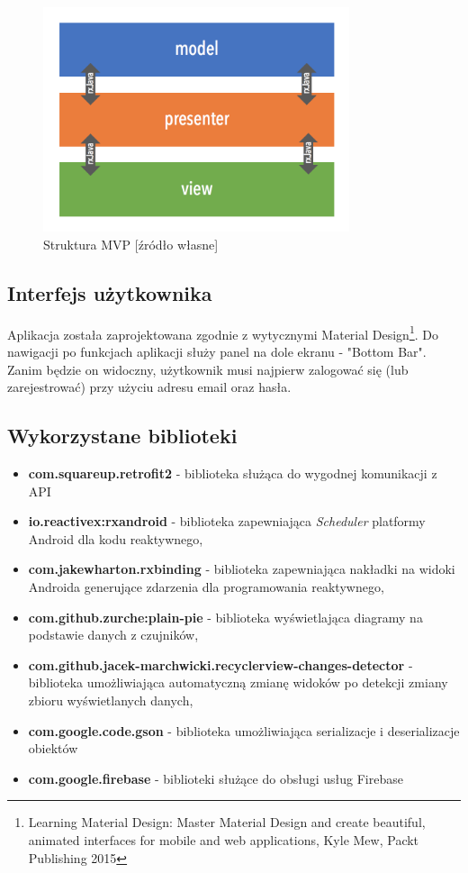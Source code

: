 \begin{figure}[H]
    \centering
    \includegraphics[width=9cm]{android-mvp.png}
    \caption{Struktura MVP [źródło własne]}
\end{figure}

\subsection{Interfejs użytkownika}
Aplikacja została zaprojektowana zgodnie z wytycznymi Material Design\footnote{Learning Material Design: Master Material Design and create beautiful, animated interfaces for mobile and web applications, Kyle Mew, Packt Publishing 2015}.
Do nawigacji po funkcjach aplikacji służy panel na dole ekranu - "Bottom Bar".
Zanim będzie on widoczny, użytkownik musi najpierw zalogować się (lub zarejestrować) przy użyciu adresu email oraz hasła.

\subsection{Wykorzystane biblioteki}
\begin{itemize}
    \item \textbf{com.squareup.retrofit2} - biblioteka służąca do wygodnej komunikacji z API
    \item \textbf{io.reactivex:rxandroid} - biblioteka zapewniająca \textit{Scheduler} platformy Android dla kodu reaktywnego,
    \item \textbf{com.jakewharton.rxbinding} - biblioteka zapewniająca nakładki na widoki Androida generujące zdarzenia dla programowania reaktywnego,
    \item \textbf{com.github.zurche:plain-pie} - biblioteka wyświetlająca diagramy na podstawie danych z czujników,
    \item \textbf{com.github.jacek-marchwicki.recyclerview-changes-detector} - biblioteka umożliwiająca automatyczną zmianę widoków po detekcji zmiany zbioru wyświetlanych danych,
    \item \textbf{com.google.code.gson} - biblioteka umożliwiająca serializacje i deserializacje obiektów
    \item \textbf{com.google.firebase} - biblioteki służące do obsługi usług Firebase
\end{itemize}

